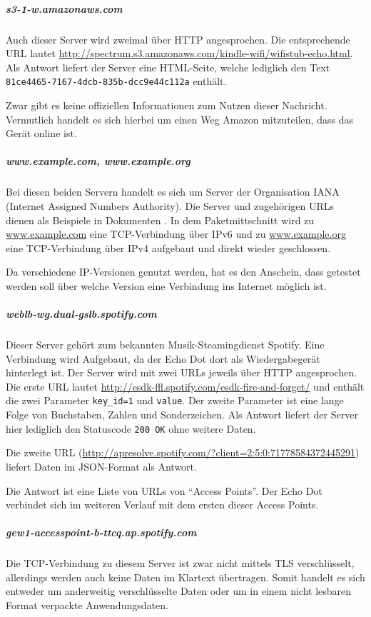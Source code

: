 \subparagraph{s3-1-w.amazonaws.com}
Auch dieser Server wird zweimal über HTTP angesprochen.
Die entsprechende URL lautet \url{http://spectrum.s3.amazonaws.com/kindle-wifi/wifistub-echo.html}.
Als Antwort liefert der Server eine HTML-Seite,
welche lediglich den Text \texttt{81ce4465-7167-4dcb-835b-dcc9e44c112a} enthält.

Zwar gibt es keine offiziellen Informationen zum Nutzen dieser Nachricht.
Vermutlich handelt es sich hierbei um einen Weg Amazon mitzuteilen,
dass das Gerät online ist.


\subparagraph{www.example.com, www.example.org}
Bei diesen beiden Servern handelt es sich um Server der Organisation IANA (Internet Assigned Numbers Authority).
Die Server und zugehörigen URLs dienen als Beispiele in Dokumenten \cite{IANA:online}.
In dem Paketmittschnitt wird zu \url{www.example.com} eine TCP-Verbindung über IPv6
und zu \url{www.example.org} eine TCP-Verbindung über IPv4 aufgebaut und direkt wieder geschlossen.

Da verschiedene IP-Versionen genutzt werden, hat es den Anschein,
dass getestet werden soll über welche Version eine Verbindung ins Internet möglich ist.

\subparagraph{weblb-wg.dual-gslb.spotify.com}
Dieser Server gehört zum bekannten Musik-Steamingdienst Spotify.
Eine Verbindung wird Aufgebaut, da der Echo Dot dort als Wiedergabegerät hinterlegt ist.
Der Server wird mit zwei URLs jeweils über HTTP angesprochen.
Die erste URL lautet \url{http://esdk-ffl.spotify.com/esdk-fire-and-forget/} und enthält die zwei Parameter \texttt{key\_id=1} und \texttt{value}.
Der zweite Parameter ist eine lange Folge von Buchstaben, Zahlen und Sonderzeichen.
Als Antwort liefert der Server hier lediglich den Statuscode \texttt{200 OK} ohne weitere Daten.

Die zweite URL (\url{http://apresolve.spotify.com/?client=2:5:0:71778584372445291}) liefert Daten im JSON-Format als Antwort.




Die Antwort ist eine Liste von URLs von \enquote{Access Points}.
Der Echo Dot verbindet sich im weiteren Verlauf mit dem ersten dieser Access Points.


\subparagraph{gew1-accesspoint-b-ttcq.ap.spotify.com}
Die TCP-Verbindung zu diesem Server ist zwar nicht mittels TLS verschlüsselt,
allerdings werden auch keine Daten im Klartext übertragen.
Somit handelt es sich entweder um anderweitig verschlüsselte Daten oder
um in einem nicht lesbaren Format verpackte Anwendungsdaten.\\

